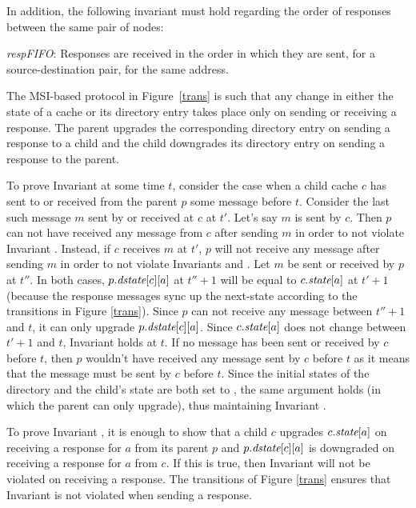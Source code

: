 In addition, the following invariant must hold regarding the order of responses
between the same pair of nodes:
\begin{inv}
\textit{respFIFO}: Responses are received in the order in which they are sent,
for a source-destination pair, for the same address.
\end{inv}

The MSI-based protocol in Figure~\ref{trans} is such that any change in either
the state of a cache or its directory entry takes place only on sending or
receiving a response. The parent upgrades the corresponding directory entry on
sending a response to a child and the child downgrades its directory entry on
sending a response to the parent.

To prove Invariant  at some time $t$, consider the case
when a child cache $c$ has sent to or received from the parent $p$ some message
before $t$. Consider the last such message $m$ sent by or received at $c$ at
$t'$. Let's say $m$ is sent by $c$. Then $p$ can not have received any message
from $c$ after sending $m$ in order to not violate Invariant .
Instead, if $c$ receives $m$ at $t'$, $p$ will not receive any message after
sending $m$ in order to not violate Invariants  and
. Let $m$ be sent or received by $p$ at $t''$. In both cases,
$p.\textit{dstate}[c][a]$ at $t''+1$ will be equal to $c.\textit{state}[a]$ at $t'+1$ (because
the response messages sync up the next-state according to the transitions in
Figure \ref{trans}). Since $p$ can not receive any message between $t''+1$ and
$t$, it can only upgrade $p.\textit{dstate}[c][a]$. Since $c.\textit{state}[a]$ does not change
between $t'+1$ and $t$, Invariant  holds at $t$. If no
message has been sent or received by $c$ before $t$, then $p$
wouldn't have received any message sent by $c$ before $t$ as it means that the
message must be sent by $c$ before $t$. Since the initial states of the
directory and the child's state are both set to \In{}, the same argument holds
(in which the parent can only upgrade), thus maintaining Invariant
.

To prove Invariant , it is enough to show that a
child $c$ upgrades $c.\textit{state}[a]$ on receiving a response for $a$ from its
parent $p$ and $p.\textit{dstate}[c][a]$ is downgraded on receiving a response for $a$
from $c$. If this is true, then Invariant  will not
be violated on receiving a response. The transitions of Figure \ref{trans}
ensures that Invariant  is not violated when sending
a response.


